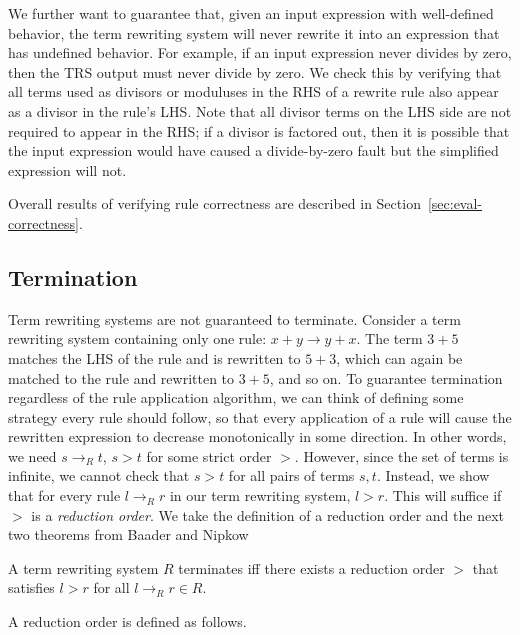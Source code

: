 \documentclass[sigplan,10pt,review,anonymous]{acmart}\settopmatter{printfolios=true,printccs=false,printacmref=false}
\begin{document}
We further want to guarantee that, given an input expression with well-defined
behavior, the term rewriting system will never rewrite it into an expression that has
undefined behavior. For example, if an input expression never divides by zero, then the
TRS output must never divide by zero. We check this by
verifying that all terms used as divisors or moduluses in the RHS of a
rewrite rule also appear as a divisor in the rule's LHS. Note that all divisor
terms on the LHS side are not required to appear in the RHS; if a divisor is
factored out, then it is possible that the input expression would have caused a
divide-by-zero fault but the simplified expression will not.

Overall results of verifying rule correctness are described in Section~\ref{sec:eval-correctness}.

\subsection{Termination}

Term rewriting systems are not guaranteed to terminate. Consider a term
rewriting system containing only one rule: $x + y \rightarrow y + x$. The term
$3 + 5$ matches the LHS of the rule and is rewritten to $5 + 3$, which can again
be matched to the rule and rewritten to $3 + 5$, and so on. To guarantee
termination regardless of the rule application algorithm, we can think of defining some strategy
every rule should follow, so that every application of a rule will cause the rewritten expression to
decrease monotonically in some direction. In other
words, we need $s \rightarrow_R t$, $s > t$ for some strict order $>$. However, since
the set of terms is infinite, we cannot check that $s > t$ for all pairs of
terms $s, t$. Instead, we show that for every rule $l \rightarrow_R r$ in our
term rewriting system, $l > r$. This will suffice if $>$ is a \emph{reduction
  order}. We take the definition of a reduction order and the next two theorems from Baader and Nipkow~\cite{baader1999term}

\begin{theorem}\label{theorem:terminates}
A term rewriting system $R$ terminates iff there exists a reduction order $>$ that satisfies $l > r$ for all $l \rightarrow_R r \in R$.
\end{theorem}

A reduction order is defined as follows.
\end{document}
